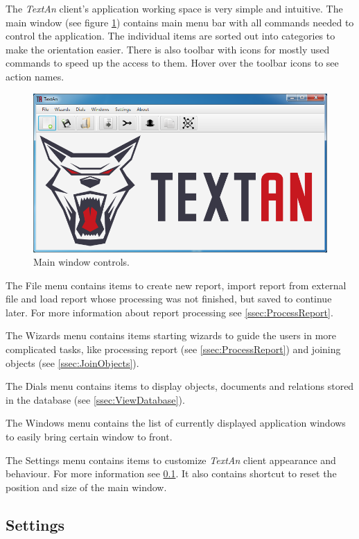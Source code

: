 \documentclass[12pt,a4paper]{report}
\newcommand{\textan}{\emph{TextAn}}
\begin{document}
The \textan{} client's application working space is very simple and intuitive.
The main window (see figure \ref{fig:MainWindow}) contains main menu bar with
all commands needed to control the application. The individual items are sorted
out into categories to make the orientation easier. There is also toolbar with
icons for mostly used commands to speed up the access to them. Hover over the
toolbar icons to see action names.

\begin{figure}[!htb]
        \centering
        \includegraphics[width=\textwidth]{Images/main}
        \caption{Main window controls.}
        \label{fig:MainWindow}
\end{figure}

The File menu contains items to create new report, import report from external
file and load report whose processing was not finished, but saved to continue
later. For more information about report processing see \ref{ssec:ProcessReport}.

The Wizards menu contains items starting wizards to guide the users in more
complicated tasks, like processing report (see \ref{ssec:ProcessReport}) and
joining objects (see \ref{ssec:JoinObjects}).

The Dials menu contains items to display objects, documents and relations
stored in the database (see \ref{ssec:ViewDatabase}).

The Windows menu contains the list of currently displayed application windows
to easily bring certain window to front.

The Settings menu contains items to customize \textan{} client appearance and
behaviour. For more information see \ref{ssec:Settings}. It also contains
shortcut to reset the position and size of the main window.

\subsection{Settings}
\label{ssec:Settings}
\end{document}
